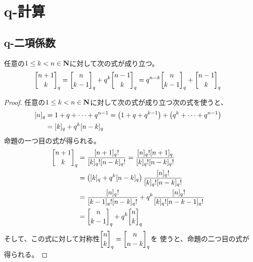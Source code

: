 {\setlength\arraycolsep{2pt}
%
\section{q-計算}\label{s1:q-計算} %
\subsection{q-二項係数}\label{s2:q-二項係数} %
	\begin{proposition}[Pascalの公式]\label{prop:Pascalの公式} %
		任意の$1\le k<n\in\mathbf{N}$に対して次の式が成り立つ。
		\begin{equation*}\begin{split}
			\qbinom{n+1}{k}_q = \qbinom{n}{k-1}_q + q^k\qbinom{n-1}{k}_q
			= q^{n-k}\qbinom{n}{k-1}_q + \qbinom{n-1}{k}_q
		\end{split}\end{equation*}
	\end{proposition} %
	\begin{proof} %
		任意の$1\le k<n\in\mathbf{N}$に対して次の式が成り立つ次の式を使うと、
		\begin{equation*}\begin{split}
			[n]_q &= 1 + q +\cdots+ q^{n-1}
			= \mathinner{\left({1 + q + q^{k-1}}\right)} + \mathinner{\left({q^{k} +\cdots+ q^{n-1}}\right)} \\
			&= [k]_q + q^k[n-k]_q
		\end{split}\end{equation*}
		命題の一つ目の式が得られる。
		\begin{equation*}\begin{split}
			\qbinom{n+1}{k}_q &= \frac{[n+1]_q!}{[k]_q![n-k]_q!}
			= \frac{[n]_q![n+1]_q}{[k]_q![n-k]_q!} \\
			&= \plr{[k]_q + q^k[n-k]_q}\frac{[n]_q!}{[k]_q![n-k]_q!} \\
			&= \frac{[n]_q!}{[k-1]_q![n-k]_q!} 
			+ q^k\frac{[n]_q!}{[k]_q![n-k-1]_q!} \\
			&= \qbinom{n}{k-1}_q + q^k\qbinom{n}{k}_q
		\end{split}\end{equation*}
		そして、この式に対して対称性$\qbinom{n}{k}_q=\qbinom{n}{n-k}_q$を
		使うと、命題の二つ目の式が得られる。
	\end{proof} %

}
